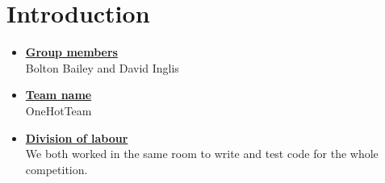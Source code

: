 \newif\ifshowsolutions
\showsolutionstrue

\newcommand{\boldline}[1]{\underline{\textbf{#1}}}



\pagestyle{fancy}






\section{Introduction}
\medskip
\begin{itemize}

    \item \boldline{Group members} \\
    Bolton Bailey and David Inglis

    \item \boldline{Team name} \\
    OneHotTeam

    \item \boldline{Division of labour} \\
    We both worked in the same room to write and test code for the whole competition.

\end{itemize}



